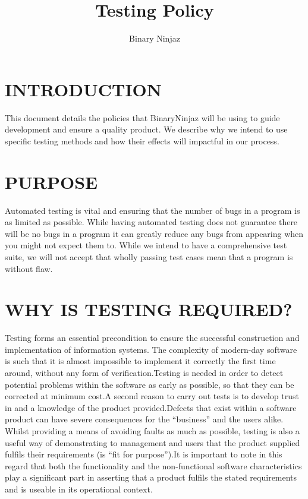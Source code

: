 \documentclass[12pt]{article}
\title{Testing Policy}
\author{Binary Ninjaz}
\date{}
\begin{document}
  \maketitle
  \newpage
  
  \tableofcontents
  \newpage
  
  \section{INTRODUCTION}
  This document details the policies that BinaryNinjaz will be using to guide development and ensure a quality product. We describe why we intend to use specific testing methods and how their effects will impactful in our process. 
  
  \section{PURPOSE}
  Automated testing is vital and ensuring that the number of bugs in a program is as limited as possible. While having automated testing does not guarantee there will be no bugs in a program it can greatly reduce any bugs from appearing when you might not expect them to. While we intend to have a comprehensive test suite, we will not accept that wholly passing test cases mean that a program is without flaw.

\section{WHY IS TESTING REQUIRED?}
Testing forms an essential precondition to ensure the successful construction and implementation of information systems. The complexity of modern-day software is such that it is almost impossible to implement it correctly the first time around, without any form of verification.\newline\newline Testing is needed in order to detect potential problems within the software as early as possible, so that they can be corrected at minimum cost.\newline\newline  A second reason to carry out tests is to develop trust in and a knowledge of the product provided.\newline\newline Defects that exist within a software product can have severe consequences for the “business” and the users alike.  Whilst providing a means of avoiding faults as much as possible, testing is also a useful way of demonstrating to management and users that the product supplied fulfils their requirements (is “fit for purpose”).\newline\newline It is important to note in this regard that both the functionality and the non-functional software characteristics play a significant part in asserting that a product fulfils the stated requirements and is useable in its operational context. 
\end{document}
